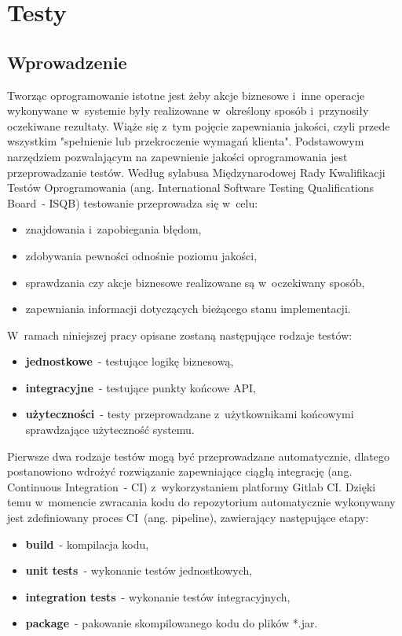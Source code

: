 \chapter{Testy}
\section{Wprowadzenie}
Tworząc oprogramowanie istotne jest żeby akcje biznesowe i~inne operacje wykonywane w~systemie były realizowane w~określony sposób i~przynosiły oczekiwane rezultaty.
Wiąże się z~tym pojęcie zapewniania jakości, czyli przede wszystkim "spełnienie lub przekroczenie wymagań klienta"\cite{book:jakosc-projektow-informatycznych}.
Podstawowym narzędziem pozwalającym na zapewnienie jakości oprogramowania jest przeprowadzanie testów.
Według sylabusa Międzynarodowej Rady Kwalifikacji Testów Oprogramowania (ang. International Software Testing Qualifications Board~- ISQB)\cite{url:istqb-syllabus} testowanie przeprowadza się w~celu:
\begin{itemize}
    \item znajdowania i~zapobiegania błędom,
    \item zdobywania pewności odnośnie poziomu jakości,
    \item sprawdzania czy akcje biznesowe realizowane są w~oczekiwany sposób,
    \item zapewniania informacji dotyczących bieżącego stanu implementacji.
\end{itemize}

\par
W~ramach niniejszej pracy opisane zostaną następujące rodzaje testów:
\begin{itemize}
    \item \textbf{jednostkowe}~- testujące logikę biznesową,
    \item \textbf{integracyjne}~- testujące punkty końcowe API,
    \item \textbf{użyteczności}~- testy przeprowadzane z~użytkownikami końcowymi sprawdzające użyteczność systemu.
\end{itemize}

\par
Pierwsze dwa rodzaje testów mogą być przeprowadzane automatycznie, dlatego postanowiono wdrożyć rozwiązanie zapewniające ciągłą integrację (ang. Continuous Integration~- CI) z~wykorzystaniem platformy Gitlab CI\cite{tech:gitlab-pipelines}.
Dzięki temu w~momencie zwracania kodu do repozytorium automatycznie wykonywany jest zdefiniowany proces CI~(ang. pipeline), zawierający następujące etapy:
\begin{itemize}
    \item \textbf{build}~- kompilacja kodu,
    \item \textbf{unit tests}~- wykonanie testów jednostkowych,
    \item \textbf{integration tests}~- wykonanie testów integracyjnych,
    \item \textbf{package}~- pakowanie skompilowanego kodu do plików *.jar.
\end{itemize}

